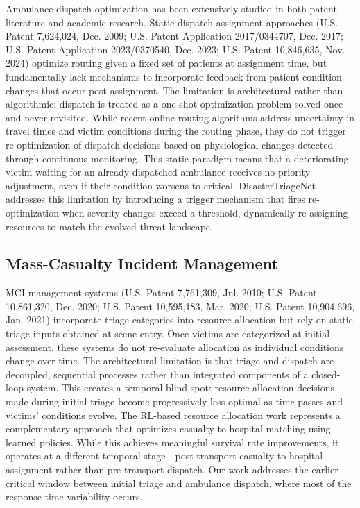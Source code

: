 \documentclass[conference]{IEEEtran}
\begin{document}
Ambulance dispatch optimization has been extensively studied in both patent literature and academic research. Static dispatch assignment approaches (U.S. Patent 7,624,024, Dec. 2009; U.S. Patent Application 2017/0344707, Dec. 2017; U.S. Patent Application 2023/0370540, Dec. 2023; U.S. Patent 10,846,635, Nov. 2024) optimize routing given a fixed set of patients at assignment time, but fundamentally lack mechanisms to incorporate feedback from patient condition changes that occur post-assignment. The limitation is architectural rather than algorithmic: dispatch is treated as a one-shot optimization problem solved once and never revisited. While recent online routing algorithms \cite{shiri2024} address uncertainty in travel times and victim conditions during the routing phase, they do not trigger re-optimization of dispatch decisions based on physiological changes detected through continuous monitoring. This static paradigm means that a deteriorating victim waiting for an already-dispatched ambulance receives no priority adjustment, even if their condition worsens to critical. DisasterTriageNet addresses this limitation by introducing a trigger mechanism that fires re-optimization when severity changes exceed a threshold, dynamically re-assigning resources to match the evolved threat landscape.

\subsection{Mass-Casualty Incident Management}

MCI management systems (U.S. Patent 7,761,309, Jul. 2010; U.S. Patent 10,861,320, Dec. 2020; U.S. Patent 10,595,183, Mar. 2020; U.S. Patent 10,904,696, Jan. 2021) incorporate triage categories into resource allocation but rely on static triage inputs obtained at scene entry. Once victims are categorized at initial assessment, these systems do not re-evaluate allocation as individual conditions change over time. The architectural limitation is that triage and dispatch are decoupled, sequential processes rather than integrated components of a closed-loop system. This creates a temporal blind spot: resource allocation decisions made during initial triage become progressively less optimal as time passes and victims' conditions evolve. The RL-based resource allocation work \cite{muratetu2025} represents a complementary approach that optimizes casualty-to-hospital matching using learned policies. While this achieves meaningful survival rate improvements, it operates at a different temporal stage---post-transport casualty-to-hospital assignment rather than pre-transport dispatch. Our work addresses the earlier critical window between initial triage and ambulance dispatch, where most of the response time variability occurs.
\end{document}
